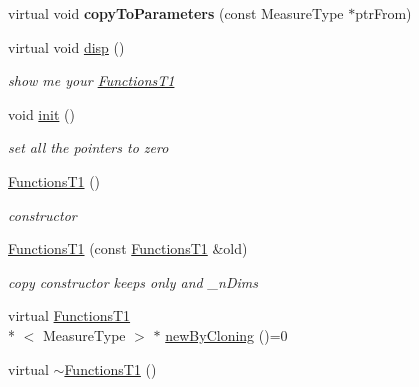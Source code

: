 \begin{DoxyCompactItemize}
\item 
\hypertarget{class_ox_1_1_functions_t1_ad2a24170cd7de14c49be27ac16dc7ac8}{virtual void {\bfseries copy\-To\-Parameters} (const Measure\-Type $\ast$ptr\-From)}\label{class_ox_1_1_functions_t1_ad2a24170cd7de14c49be27ac16dc7ac8}

\item 
\hypertarget{class_ox_1_1_functions_t1_a21708a9d44f261ba53648c2e6fcdd3a5}{virtual void \hyperlink{class_ox_1_1_functions_t1_a21708a9d44f261ba53648c2e6fcdd3a5}{disp} ()}\label{class_ox_1_1_functions_t1_a21708a9d44f261ba53648c2e6fcdd3a5}

\begin{DoxyCompactList}\small\item\em show me your \hyperlink{class_ox_1_1_functions_t1}{Functions\-T1} \end{DoxyCompactList}\item 
\hypertarget{class_ox_1_1_functions_t1_af417526f77ac0244be5bfa21ba39f7cb}{void \hyperlink{class_ox_1_1_functions_t1_af417526f77ac0244be5bfa21ba39f7cb}{init} ()}\label{class_ox_1_1_functions_t1_af417526f77ac0244be5bfa21ba39f7cb}

\begin{DoxyCompactList}\small\item\em set all the pointers to zero \end{DoxyCompactList}\item 
\hypertarget{class_ox_1_1_functions_t1_a7dae9dc71ec97e9eef1308c9937aaaf0}{\hyperlink{class_ox_1_1_functions_t1_a7dae9dc71ec97e9eef1308c9937aaaf0}{Functions\-T1} ()}\label{class_ox_1_1_functions_t1_a7dae9dc71ec97e9eef1308c9937aaaf0}

\begin{DoxyCompactList}\small\item\em constructor \end{DoxyCompactList}\item 
\hyperlink{class_ox_1_1_functions_t1_a8b14d232e9136a64ea3ae8f7a162daad}{Functions\-T1} (const \hyperlink{class_ox_1_1_functions_t1}{Functions\-T1} \&old)
\begin{DoxyCompactList}\small\item\em copy constructor keeps only and \-\_\-n\-Dims \end{DoxyCompactList}\item 
virtual \hyperlink{class_ox_1_1_functions_t1}{Functions\-T1}\\*
$<$ Measure\-Type $>$ $\ast$ \hyperlink{class_ox_1_1_functions_t1_a2246ea540016c650d5a18100697eacb8}{new\-By\-Cloning} ()=0
\item 
\hypertarget{class_ox_1_1_functions_t1_a900d5602b3dd10fca760a304e41da9b5}{virtual \hyperlink{class_ox_1_1_functions_t1_a900d5602b3dd10fca760a304e41da9b5}{$\sim$\-Functions\-T1} ()}\label{class_ox_1_1_functions_t1_a900d5602b3dd10fca760a304e41da9b5}


\end{DoxyCompactItemize}
